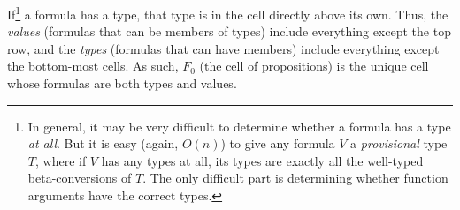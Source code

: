 \documentclass{article}
\begin{document}
  If\footnote{In general, it may be very difficult to determine whether a formula has a type \emph{at all}. But it is easy (again, $O(n)$) to give any formula $V$ a \emph{provisional} type $T$, where if $V$ has any types at all, its types are exactly all the well-typed beta-conversions of $T$. The only difficult part is determining whether function arguments have the correct types.} a formula has a type, that type is in the cell directly above its own. Thus, the \emph{values} (formulas that can be members of types) include everything except the top row, and the \emph{types} (formulas that can have members) include everything except the bottom-most cells. As such, $F_0$ (the cell of propositions) is the unique cell whose formulas are both types and values.
\end{document}
